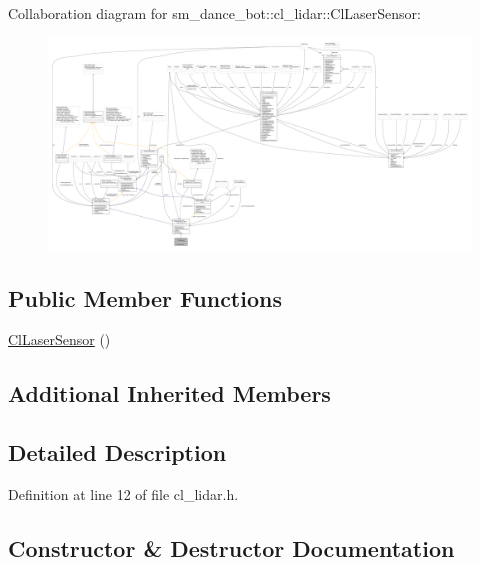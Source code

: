 Collaboration diagram for sm\+\_\+dance\+\_\+bot\+:\+:cl\+\_\+lidar\+:\+:Cl\+Laser\+Sensor\+:\nopagebreak
\begin{figure}[H]
\begin{center}
\leavevmode
\includegraphics[width=350pt]{classsm__dance__bot_1_1cl__lidar_1_1ClLaserSensor__coll__graph}
\end{center}
\end{figure}
\subsection*{Public Member Functions}
\begin{DoxyCompactItemize}
\item 
\hyperlink{classsm__dance__bot_1_1cl__lidar_1_1ClLaserSensor_ab028161bd20f5c6be3f5dcc69d5815e3}{Cl\+Laser\+Sensor} ()
\end{DoxyCompactItemize}
\subsection*{Additional Inherited Members}


\subsection{Detailed Description}


Definition at line 12 of file cl\+\_\+lidar.\+h.



\subsection{Constructor \& Destructor Documentation}
